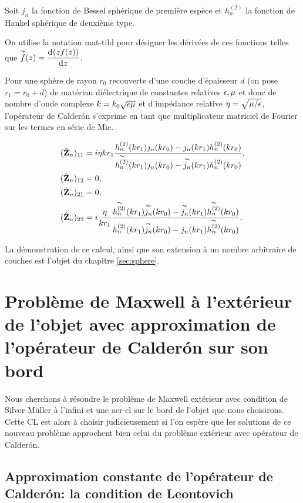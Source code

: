    Soit \(j_n\) la fonction de Bessel sphérique de première espèce et \(h_n^{(2)}\) la fonction de Hankel sphérique de deuxième type.

    On utilise la notation \gls{mat-tild} pour désigner les dérivées de ces fonctions telles que \(\tilde{f}(z) = \ddp{z}{(zf(z))}\).

    Pour une sphère de rayon \(r_0\) recouverte d'une couche d'épaisseur \(d\) (on pose \(r_1=r_0 + d\)) de matériau diélectrique de constantes relatives \(\eps,\mu\) et donc de nombre d'onde complexe \(k = k_0\sqrt{\eps\mu}\) et d'impédance relative \(\eta=\sqrt{{\mu}/{\eps}}\), l'opérateur de Calderón s'exprime en tant que multiplicateur  matriciel de Fourier sur les termes en série de Mie.

    \begin{align*}
      (\hat \mZ_n)_{11} &=  i\eta kr_1 
        \frac{
          h^{(2)}_n(kr_1)j_n(kr_0)-j_n(kr_1)h^{(2)}_n(kr_0)
        }{
          \tilde{h^{(2)}_n}(kr_1)j_n(kr_0)-\tilde{j_n}(kr_1)h^{(2)}_n(kr_0)
        },
      \\
      (\hat \mZ_n)_{12} &= 0,
      \\
      (\hat \mZ_n)_{21} &= 0,
      \\
      (\hat \mZ_n)_{22} &= i \frac{\eta}{kr_1}
        \frac{
          \tilde{h^{(2)}_n}(kr_1)\tilde{j_n}(kr_0)-\tilde{j_n}(kr_1)\tilde{h^{(2)}_n}(kr_0)
        }{
          {h^{(2)}_n}(kr_1)\tilde{j_n}(kr_0)-{j_n}(kr_1)\tilde{h^{(2)}_n}(kr_0)
        }.
    \end{align*}

    La démonstration de ce calcul, ainsi que son extension à un nombre arbitraire de couches est l'objet du chapitre \ref{sec:sphere}.

\section{Problème de Maxwell à l'extérieur de l'objet avec approximation de l'opérateur de Calderón sur son bord}

  Nous cherchons à résoudre le problème de Maxwell extérieur avec condition de Silver-Müller à l'infini et une \gls{acr-cl} sur le bord de l'objet que nous choisirons.
  Cette CL est alors à choisir judicieusement si l'on espère que les solutions de ce nouveau problème approchent bien celui du problème extérieur avec opérateur de Calderón.

  \subsection{Approximation constante de l'opérateur de Calderón: la condition de Leontovich}
        
